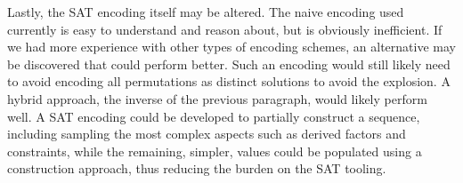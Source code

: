 Lastly, the SAT encoding itself may be altered. The naive encoding used currently is easy to understand and reason about, but is obviously inefficient. If we had more experience with other types of encoding schemes, an alternative may be discovered that could perform better. Such an encoding would still likely need to avoid encoding all permutations as distinct solutions to avoid the explosion. A hybrid approach, the inverse of the previous paragraph, would likely perform well. A SAT encoding could be developed to partially construct a sequence, including sampling the most complex aspects such as derived factors and constraints, while the remaining, simpler, values could be populated using a construction approach, thus reducing the burden on the SAT tooling.


